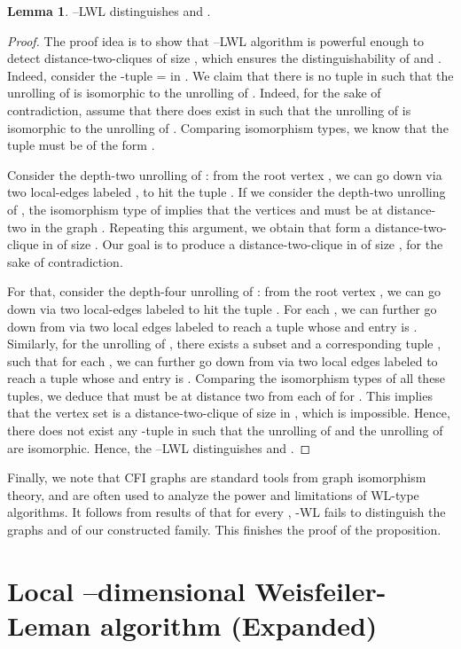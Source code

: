 \documentclass{article}
\theoremstyle{definition}
\newtheorem{lemma}[theorem]{Lemma}
\newcommand{\kwl}{-\textsf{WL}\xspace}
\newcommand{\localkwl}{--\textsf{LWL}\xspace}
\begin{document}
\begin{lemma}
	\localkwl distinguishes  and . 
\end{lemma} 
\begin{proof}
	The proof idea is to show that \localkwl algorithm is powerful enough to detect distance-two-cliques of size , which ensures the distinguishability of  and . Indeed, consider the -tuple  =  in . We claim that there is no tuple  in  such that the unrolling of  is isomorphic to the unrolling of . Indeed, for the sake of contradiction, assume that there does exist  in  such that the unrolling of  is isomorphic to the unrolling of . Comparing isomorphism types, we know that the tuple  must be of the form . 
	
	Consider the depth-two unrolling of : from the root vertex , we can go down via two local-edges labeled , to hit the tuple . If we consider the depth-two unrolling of , the isomorphism type of  implies that the vertices  and  must be at distance-two in the graph . Repeating this argument, we obtain that  form a distance-two-clique in  of size . Our goal is to produce a distance-two-clique in  of size , for the sake of contradiction. 
	
	For that, consider the depth-four unrolling of : from the root vertex , we can go down via two local-edges labeled  to hit the tuple . For each , we can further go down from  via two local edges labeled  to reach a tuple whose  and  entry is . Similarly, for the unrolling of , there exists a subset  and a corresponding tuple , such that for each , we can further go down from  via two local edges labeled  to reach a tuple whose  and  entry is . Comparing the isomorphism types of all these tuples, we deduce that  must be at distance two from each of  for . This implies that the vertex set  is a distance-two-clique of size  in , which is impossible. Hence, there does not exist any -tuple  in  such that the unrolling of  and the unrolling of  are isomorphic. Hence, the \localkwl distinguishes  and . 
\end{proof}

Finally, we note that CFI graphs are standard tools from graph isomorphism theory, and are often used to analyze the power and limitations of WL-type algorithms. It follows from results of \cite{Cai+1992} that for every , \kwl fails to distinguish the graphs  and  of our constructed family. This finishes the proof of the proposition. 

\section{Local --dimensional Weisfeiler-Leman algorithm (Expanded)}\label{lwl}
\end{document}
